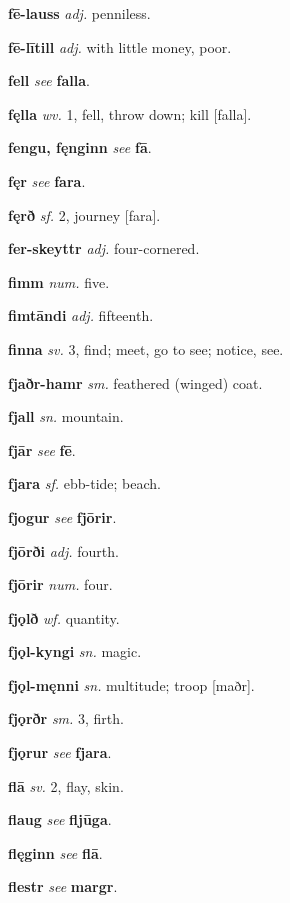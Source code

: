 \documentclass[12pt,letterpaper]{book}
\begin{document}
\noindent
\textbf{fē-lauss} \textit{adj.} penniless.

\noindent
\textbf{fē-lītill} \textit{adj.} with little money, poor.

\noindent
\textbf{fell} \textit{} \textit{see} \textbf{falla}.

\noindent
\textbf{fęlla} \textit{wv.} 1, fell, throw down; kill [falla].

\noindent
\textbf{fengu, fęnginn} \textit{} \textit{see} \textbf{fā}.

\noindent
\textbf{fęr} \textit{} \textit{see} \textbf{fara}.

\noindent
\textbf{fęrð} \textit{sf.} 2, journey [fara].

\noindent
\textbf{fer-skeyttr} \textit{adj.} four-cornered.

\noindent
\textbf{fimm} \textit{num.} five.

\noindent
\textbf{fimtāndi} \textit{adj.} fifteenth.

\noindent
\textbf{finna} \textit{sv.} 3, find; meet, go to see; notice, see.

\noindent
\textbf{fjaðr-hamr} \textit{sm.} feathered (winged) coat.

\noindent
\textbf{fjall} \textit{sn.} mountain.

\noindent
\textbf{fjār} \textit{} \textit{see} \textbf{fē}.

\noindent
\textbf{fjara} \textit{sf.} ebb-tide; beach.

\noindent
\textbf{fjogur} \textit{} \textit{see} \textbf{fjōrir}.

\noindent
\textbf{fjōrði} \textit{adj.} fourth.

\noindent
\textbf{fjōrir} \textit{num.} four.

\noindent
\textbf{fjǫlð} \textit{wf.} quantity.

\noindent
\textbf{fjǫl-kyngi} \textit{sn.} magic.

\noindent
\textbf{fjǫl-męnni} \textit{sn.} multitude; troop [maðr].

\noindent
\textbf{fjǫrðr} \textit{sm.} 3, firth.

\noindent
\textbf{fjǫrur} \textit{} \textit{see} \textbf{fjara}.

\noindent
\textbf{flā} \textit{sv.} 2, flay, skin.

\noindent
\textbf{flaug} \textit{} \textit{see} \textbf{fljūga}.

\noindent
\textbf{flęginn} \textit{} \textit{see} \textbf{flā}.

\noindent
\textbf{flestr} \textit{} \textit{see} \textbf{margr}.
\end{document}
